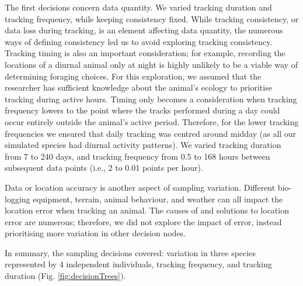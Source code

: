 \documentclass[10pt,a4paper]{article}
\begin{document}
The first decisions concern data quantity.
We varied tracking duration and tracking frequency, while keeping consistency fixed.
While tracking consistency, or data loss during tracking, is an element affecting data quantity, the numerous ways of defining consistency led us to avoid exploring tracking consistency.
Tracking timing is also an important consideration; for example, recording the locations of a diurnal animal only at night is highly unlikely to be a viable way of determining foraging choices.
For this exploration, we assumed that the researcher has sufficient knowledge about the animal's ecology to prioritise tracking during active hours.
Timing only becomes a consideration when tracking frequency lowers to the point where the tracks performed during a day could occur entirely outside the animal's active period.
Therefore, for the lower tracking frequencies we ensured that daily tracking was centred around midday (as all our simulated species had diurnal activity patterns).
We varied tracking duration from 7 to 240 days, and tracking frequency from 0.5 to 168 hours between subsequent data points (i.e., 2 to 0.01 points per hour).

Data or location accuracy is another aspect of sampling variation.
Different bio-logging equipment, terrain, animal behaviour, and weather can all impact the location error when tracking an animal.
The causes of and solutions to location error are numerous; therefore, we did not explore the impact of error, instead prioritising more variation in other decision nodes.

In summary, the sampling decisions covered: variation in three species represented by 4 independent individuals, tracking frequency, and tracking duration (Fig. \ref{fig:decisionTrees}).
\end{document}
